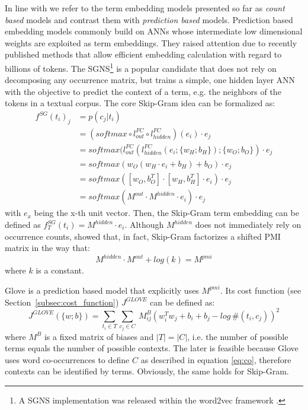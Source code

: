 In line with \textcite{levy_improving_2015} we refer to the term embedding models presented so far as \textit{count based} models and contrast them with \textit{prediction based} models. Prediction based embedding models commonly build on \ac{ANN}s whose intermediate low %
dimensional weights are exploited as term embeddings. They raised attention due to recently published methods that allow efficient embedding calculation with regard to billions of tokens. The \ac{SGNS}\footnote{A \ac{SGNS} implementation was released within the word2vec framework \autocite{mikolov_efficient_2013}.} \autocite{mikolov_distributed_2013} is a popular candidate that does not rely on decomposing any occurrence matrix, but trains a simple, one hidden layer \acs{ANN} with the objective to predict the context of a term, e.g. the neighbors of the tokens in a textual corpus. The core Skip-Gram idea can be formalized as:
\begin{equation} \label{eq:sg}
\begin{split}
f^{SG}(t_i)_j & = p(c_j|t_i) \\
  & = (softmax \circ l^{FC}_{out} \circ l^{FC}_{hidden})(e_i) \cdot e_j \\
  & = softmax(l^{FC}_{out}(l^{FC}_{hidden}(e_i; \{w_{H};b_{H}\}); \{w_{O};b_{O}\}) \cdot e_j \\
  & = softmax(w_{O}(w_{H} \cdot e_i + b_{H}) + b_{O}) \cdot e_j \\
  & = softmax([w_{O},b^T_{O}] \cdot [w_{H},b^T_{H}]\cdot e_i) 
  \cdot e_j \\
  & = softmax(M^{out} \cdot M^{hidden} \cdot e_i) \cdot e_j
\end{split}
\end{equation}
with $e_x$ being the x-th unit vector.
Then, the Skip-Gram term embedding can be defined as $f_T^{SG}(t_i) = M^{hidden} \cdot e_i$. Although $M^{hidden}$ does not immediately rely on occurrence counts, \textcite{levy_neural_2014} showed that, in fact, Skip-Gram factorizes a shifted \ac{PMI} matrix in the way that: 
\begin{equation}
M^{hidden} \cdot M^{out} + log(k) = M^{pmi}
\end{equation}
where $k$ is a constant. 

Glove \autocite{pennington_glove_2014} is a prediction based model that explicitly uses $M^{pmi}$. Its cost function (see Section~\ref{subsec:cost_function}) $J^{GLOVE}$ can be defined as:%
\begin{equation} \label{eq:glove_cost}
J^{GLOVE}(\{w; b\}) = \sum\limits_{t_i \in T}\sum\limits_{c_j \in C}\ M^{B}_{ij}(w_i^Tw_j + b_i + b_j - log\,\#(t_i,c_j))^2
\end{equation}
where $M^B$ is a fixed matrix of biases and $|T| = |C|$, i.e. the number of possible terms equals the number of possible contexts. The later is feasible because Glove uses word co-occurrences to define $C$ as described in equation \eqref{eq:co}, therefore contexts can be identified by terms. Obviously, the same holds for Skip-Gram.

